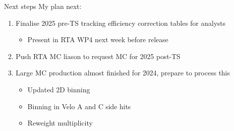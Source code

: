 \documentclass[xcolor={dvipsnames}]{beamer}
\begin{document}
\begin{frame}{Next steps}
  \vspace{0.0cm}
  {\Large My plan next:}
  \vspace{0.2cm}
  \begin{enumerate}
    \setlength\itemsep{1.0em}
    \item{Finalise 2025 pre-TS tracking efficiency correction tables for analysts}
    \begin{itemize}
      \item[-]{Present in RTA WP4 next week before release}
    \end{itemize}
    \item{Push RTA MC liason to request MC for 2025 post-TS}
    \item{Large MC production almost finished for 2024, prepare to process this}
    \begin{itemize}
      \item[-]{Updated 2D binning}
      \item[-]{Binning in Velo A and C side hits}
      \item[-]{Reweight multiplicity}
    \end{itemize}
  \end{enumerate}
\end{frame}
\end{document}
